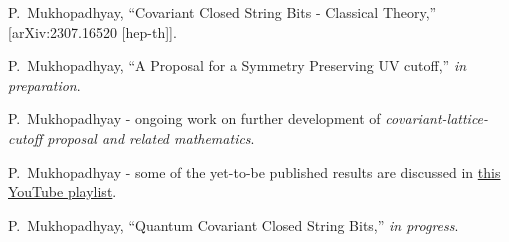 \documentclass[
article,12pt]{article}
\begin{document}
\begin{thebibliography}{99}
P.~Mukhopadhyay,
``Covariant Closed String Bits - Classical Theory,''
[arXiv:2307.16520 [hep-th]].

P.~Mukhopadhyay,
``A Proposal for a Symmetry Preserving UV cutoff,'' {\it in preparation}. 

P.~Mukhopadhyay -  ongoing work on further development of {\it covariant-lattice-cutoff proposal and related mathematics}.

P.~Mukhopadhyay - some of the yet-to-be published results are discussed in \href{https://youtube.com/playlist?list=PLLgNOPmTPi1_riYtTFPtui_pHjY7hT8Rt&si=gl_7YEJjyM7MilmS}{this YouTube playlist}.

P.~Mukhopadhyay,
``Quantum Covariant Closed String Bits,'' {\it in progress}.


\end{thebibliography}
\end{document}
